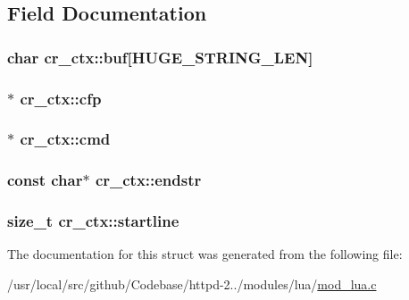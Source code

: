 \subsection{Field Documentation}
\subsubsection[{\texorpdfstring{buf}{buf}}]{\setlength{\rightskip}{0pt plus 5cm}char cr\+\_\+ctx\+::buf\mbox{[}{\bf H\+U\+G\+E\+\_\+\+S\+T\+R\+I\+N\+G\+\_\+\+L\+EN}\mbox{]}}\hypertarget{structcr__ctx_acb09cccbeae1286ec559c80277503bec}{}\label{structcr__ctx_acb09cccbeae1286ec559c80277503bec}
\subsubsection[{\texorpdfstring{cfp}{cfp}}]{$\ast$ cr\+\_\+ctx\+::cfp}\hypertarget{structcr__ctx_a22886189237b4a7a3685150cc4c205ee}{}\label{structcr__ctx_a22886189237b4a7a3685150cc4c205ee}
\subsubsection[{\texorpdfstring{cmd}{cmd}}]{$\ast$ cr\+\_\+ctx\+::cmd}\hypertarget{structcr__ctx_afbf28b2f265de79bdf9b51c429753999}{}\label{structcr__ctx_afbf28b2f265de79bdf9b51c429753999}
\subsubsection[{\texorpdfstring{endstr}{endstr}}]{\setlength{\rightskip}{0pt plus 5cm}const char$\ast$ cr\+\_\+ctx\+::endstr}\hypertarget{structcr__ctx_a120b0ab6cc06d525401c79bab8458d9f}{}\label{structcr__ctx_a120b0ab6cc06d525401c79bab8458d9f}
\subsubsection[{\texorpdfstring{startline}{startline}}]{\setlength{\rightskip}{0pt plus 5cm}size\+\_\+t cr\+\_\+ctx\+::startline}\hypertarget{structcr__ctx_a32efa76a4304e6e815d9835222026c6f}{}\label{structcr__ctx_a32efa76a4304e6e815d9835222026c6f}


The documentation for this struct was generated from the following file\+:\begin{DoxyCompactItemize}
\item 
/usr/local/src/github/\+Codebase/httpd-\/2../modules/lua/\hyperlink{mod__lua_8c}{mod\+\_\+lua.\+c}\end{DoxyCompactItemize}
